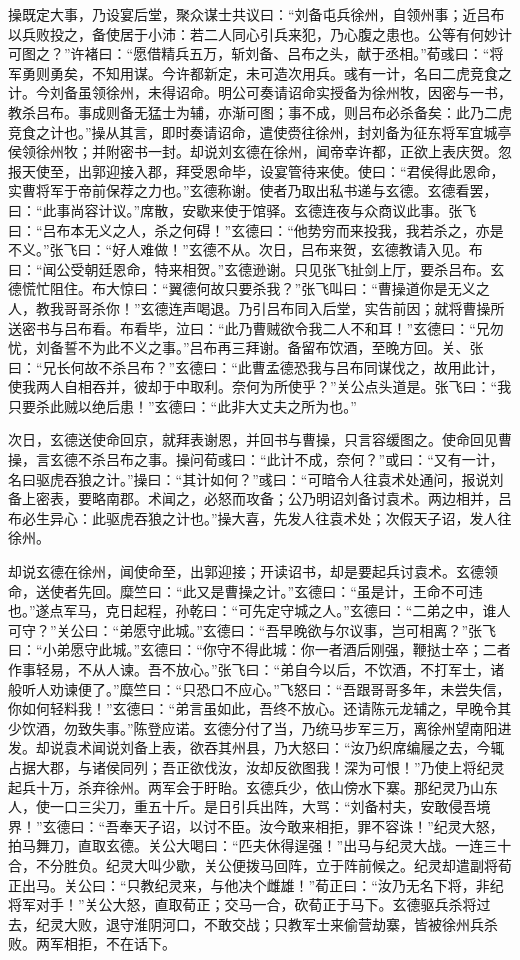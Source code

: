 操既定大事，乃设宴后堂，聚众谋士共议曰：“刘备屯兵徐州，自领州事；近吕布以兵败投之，备使居于小沛：若二人同心引兵来犯，乃心腹之患也。公等有何妙计可图之？”许褚曰：“愿借精兵五万，斩刘备、吕布之头，献于丞相。”荀彧曰：“将军勇则勇矣，不知用谋。今许都新定，未可造次用兵。彧有一计，名曰二虎竞食之计。今刘备虽领徐州，未得诏命。明公可奏请诏命实授备为徐州牧，因密与一书，教杀吕布。事成则备无猛士为辅，亦渐可图；事不成，则吕布必杀备矣：此乃二虎竞食之计也。”操从其言，即时奏请诏命，遣使赍往徐州，封刘备为征东将军宜城亭侯领徐州牧；并附密书一封。却说刘玄德在徐州，闻帝幸许都，正欲上表庆贺。忽报天使至，出郭迎接入郡，拜受恩命毕，设宴管待来使。使曰：“君侯得此恩命，实曹将军于帝前保荐之力也。”玄德称谢。使者乃取出私书递与玄德。玄德看罢，曰：“此事尚容计议。”席散，安歇来使于馆驿。玄德连夜与众商议此事。张飞曰：“吕布本无义之人，杀之何碍！”玄德曰：“他势穷而来投我，我若杀之，亦是不义。”张飞曰：“好人难做！”玄德不从。次日，吕布来贺，玄德教请入见。布曰：“闻公受朝廷恩命，特来相贺。”玄德逊谢。只见张飞扯剑上厅，要杀吕布。玄德慌忙阻住。布大惊曰：“翼德何故只要杀我？”张飞叫曰：“曹操道你是无义之人，教我哥哥杀你！”玄德连声喝退。乃引吕布同入后堂，实告前因；就将曹操所送密书与吕布看。布看毕，泣曰：“此乃曹贼欲令我二人不和耳！”玄德曰：“兄勿忧，刘备誓不为此不义之事。”吕布再三拜谢。备留布饮酒，至晚方回。关、张曰：“兄长何故不杀吕布？”玄德曰：“此曹孟德恐我与吕布同谋伐之，故用此计，使我两人自相吞并，彼却于中取利。奈何为所使乎？”关公点头道是。张飞曰：“我只要杀此贼以绝后患！”玄德曰：“此非大丈夫之所为也。”

次日，玄德送使命回京，就拜表谢恩，并回书与曹操，只言容缓图之。使命回见曹操，言玄德不杀吕布之事。操问荀彧曰：“此计不成，奈何？”或曰：“又有一计，名曰驱虎吞狼之计。”操曰：“其计如何？”彧曰：“可暗令人往袁术处通问，报说刘备上密表，要略南郡。术闻之，必怒而攻备；公乃明诏刘备讨袁术。两边相并，吕布必生异心：此驱虎吞狼之计也。”操大喜，先发人往袁术处；次假天子诏，发人往徐州。

却说玄德在徐州，闻使命至，出郭迎接；开读诏书，却是要起兵讨袁术。玄德领命，送使者先回。糜竺曰：“此又是曹操之计。”玄德曰：“虽是计，王命不可违也。”遂点军马，克日起程，孙乾曰：“可先定守城之人。”玄德曰：“二弟之中，谁人可守？”关公曰：“弟愿守此城。”玄德曰：“吾早晚欲与尔议事，岂可相离？”张飞曰：“小弟愿守此城。”玄德曰：“你守不得此城：你一者酒后刚强，鞭挞士卒；二者作事轻易，不从人谏。吾不放心。”张飞曰：“弟自今以后，不饮酒，不打军士，诸般听人劝谏便了。”糜竺曰：“只恐口不应心。”飞怒曰：“吾跟哥哥多年，未尝失信，你如何轻料我！”玄德曰：“弟言虽如此，吾终不放心。还请陈元龙辅之，早晚令其少饮酒，勿致失事。”陈登应诺。玄德分付了当，乃统马步军三万，离徐州望南阳进发。却说袁术闻说刘备上表，欲吞其州县，乃大怒曰：“汝乃织席编屦之去，今辄占据大郡，与诸侯同列；吾正欲伐汝，汝却反欲图我！深为可恨！”乃使上将纪灵起兵十万，杀弃徐州。两军会于盱眙。玄德兵少，依山傍水下寨。那纪灵乃山东人，使一口三尖刀，重五十斤。是日引兵出阵，大骂：“刘备村夫，安敢侵吾境界！”玄德曰：“吾奉天子诏，以讨不臣。汝今敢来相拒，罪不容诛！”纪灵大怒，拍马舞刀，直取玄德。关公大喝曰：“匹夫休得逞强！”出马与纪灵大战。一连三十合，不分胜负。纪灵大叫少歇，关公便拨马回阵，立于阵前候之。纪灵却遣副将荀正出马。关公曰：“只教纪灵来，与他决个雌雄！”荀正曰：“汝乃无名下将，非纪将军对手！”关公大怒，直取荀正；交马一合，砍荀正于马下。玄德驱兵杀将过去，纪灵大败，退守淮阴河口，不敢交战；只教军士来偷营劫寨，皆被徐州兵杀败。两军相拒，不在话下。

